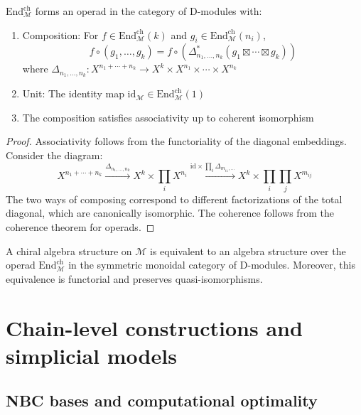 \begin{proposition}
\label{prop:operadic-structure}
$\text{End}_{\mathcal{M}}^{\text{ch}}$ forms an operad in the category of D-modules with:
\begin{enumerate}
\item Composition: For $f \in \text{End}_{\mathcal{M}}^{\text{ch}}(k)$ and $g_i \in \text{End}_{\mathcal{M}}^{\text{ch}}(n_i)$,
\[
f \circ (g_1, \ldots, g_k) = f \circ \left(\Delta_{n_1,\ldots,n_k}^* (g_1 \boxtimes \cdots \boxtimes g_k)\right)
\]
where $\Delta_{n_1,\ldots,n_k}: X^{n_1 + \cdots + n_k} \to X^k \times X^{n_1} \times \cdots \times X^{n_k}$
 
\item Unit: The identity map $\text{id}_{\mathcal{M}} \in \text{End}_{\mathcal{M}}^{\text{ch}}(1)$
 
\item The composition satisfies associativity up to coherent isomorphism
\end{enumerate}
\end{proposition}
 
\begin{proof}
Associativity follows from the functoriality of the diagonal embeddings. Consider the diagram:
\[
X^{n_1 + \cdots + n_k} \xrightarrow{\Delta_{n_1,\ldots,n_k}} X^k \times \prod_i X^{n_i} 
\xrightarrow{\text{id} \times \prod_i \Delta_{m_{i1},\ldots}} X^k \times \prod_i \prod_j X^{m_{ij}}
\]
The two ways of composing correspond to different factorizations of the total diagonal, which are 
canonically isomorphic. The coherence follows from the coherence theorem for operads.
\end{proof}
 
\begin{theorem}
\label{thm:chiral-algebra-objects}
A chiral algebra structure on $\mathcal{M}$ is equivalent to an algebra structure over the operad
$\text{End}_{\mathcal{M}}^{\text{ch}}$ in the symmetric monoidal category of D-modules. Moreover, this 
equivalence is functorial and preserves quasi-isomorphisms.
\end{theorem}


 \section{Chain-level constructions and simplicial models}
 
\subsection{NBC bases and computational optimality}
 
